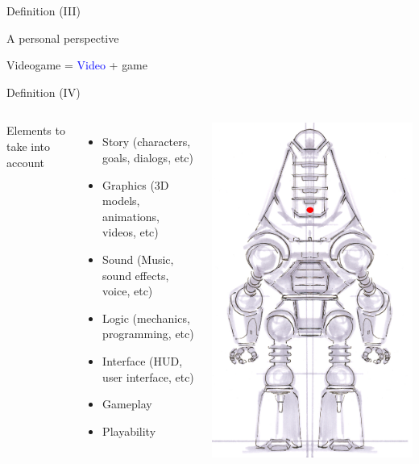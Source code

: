 \documentclass[10pt,compress]{beamer} %
\begin{document}
\begin{frame}{Definition (III)}
	\begin{center}
	A personal perspective
	\end{center}

	\begin{center}
	\huge Videogame = \textcolor{blue}{Video} + \alert{game}
	\end{center}

\end{frame}

\begin{frame}{Definition (IV)}
    \begin{columns}
		Elements to take into account

 	 	\begin{itemize}
		\item Story (characters, goals, dialogs, etc)
		\item Graphics (3D models, animations, videos, etc)
		\item Sound (Music, sound effects, voice, etc)
		\item Logic (mechanics, programming, etc)
		\item Interface (\alert{HUD}, \alert{user interface}, etc)
		\item \alert{Gameplay}
        \item \alert{Playability}
		\end{itemize}

		\centering\includegraphics[width=0.7\linewidth]{figs/ProtectronCA2}\\
	\end{columns}
\end{frame}
\end{document}
